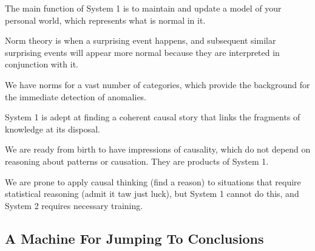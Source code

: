 \bit
\item The main function of System 1 is to maintain and update a model of your personal world, which represents what
is normal in it.
\item Norm theory is when a surprising event happens, and subsequent similar surprising events will appear more
normal because they are interpreted in conjunction with it.
\item We have norms for a vast number of categories, which provide the background for the immediate detection of
anomalies.
\item System 1 is adept at finding a coherent causal story that links the fragments of knowledge at its disposal.
\item We are ready from birth to have impressions of causality, which do not depend on reasoning about patterns or
causation. They are products of System 1.
\item We are prone to apply causal thinking (find a reason) to situations that require statistical reasoning (admit
it taw just luck), but System 1 cannot do this, and System 2 requires necessary training.
\eit

\subsection*{A Machine For Jumping To Conclusions}

